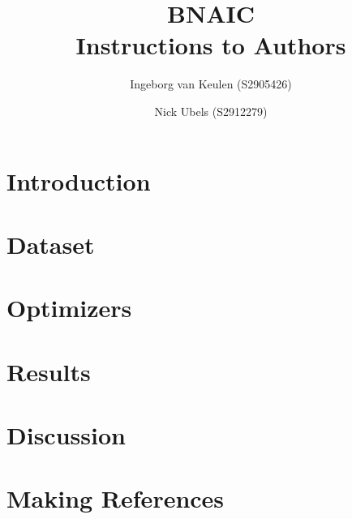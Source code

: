 \documentclass{article}
\title{\textbf{\huge BNAIC\\ Instructions to Authors}}%
\author{Ingeborg van Keulen (S2905426) \and
    Nick Ubels (S2912279)}
\begin{document}
\ttl
\thispagestyle{empty}

\section{Introduction}

\section{Dataset}

\section{Optimizers}

\section{Results}

\section{Discussion}

\section{Making References}



\end{document}
